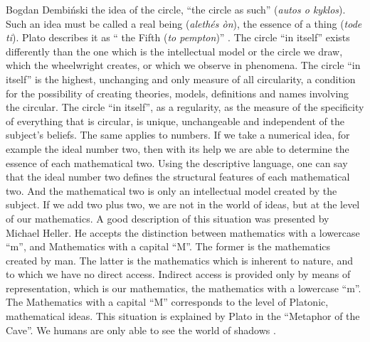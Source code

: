 \begin{artengenv}{Bogdan Dembiński}
 the idea of the circle, ``the circle as such'' (\textit{autos o kyklos}). Such an idea must be called a real being
(\textit{alethés òn}), the essence of a thing (\textit{tode ti}). Plato describes it as ``%
the Fifth (\textit{to pempton})''
\parencite[Letters , 342a-343d]{plato_platonis_1955}.
The circle ``in itself''
exists differently than the one which is the intellectual model or the circle we draw, which the wheelwright creates,
or which we observe in phenomena. The circle ``in itself'' is the highest, unchanging and only measure of all
circularity, a condition for the possibility of creating theories, models, definitions and names %
involving the circular. The circle ``in itself'', as a regularity, as the measure of the specificity of everything that is
circular, is unique, unchangeable and independent of the subject’s %
beliefs.%
The same applies to numbers. If we take a numerical idea, for example the ideal number two, then with its help we are
able to determine the essence of each mathematical two. Using the descriptive language, one can say that the ideal
number two defines the structural features of each mathematical two. And the mathematical two is only an intellectual
model created by the subject. If we add two plus two, we are not in the world of ideas, but at the level of our
mathematics. A good description of this situation was presented by Michael Heller. He accepts the distinction between
mathematics with a lowercase ``m'', and Mathematics with a capital ``M''. The former is the mathematics created by man. The
latter is the mathematics which is inherent to nature, and to which we have no direct access. Indirect access is
provided only by means of representation, which is our mathematics, the mathematics with a lowercase ``m''. The
Mathematics with a capital ``M'' corresponds to the level of Platonic, mathematical ideas. This situation is explained by
Plato in the ``Metaphor of the Cave''. We humans are only able to see the world of shadows
\parencite[Republic, 514-518d]{plato_platonis_1955}.

\end{artengenv}

